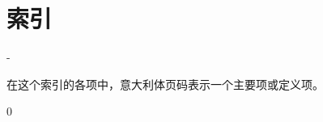 

\chapter{索引}

\par
\kern-\baselineskip

\noindent 在这个索引的各项中，意大利体页码表示一个主要项或定义项。

\par
%
\beginindex

\let\+ = 0 %


\endindex

\endchapter
\byebye
